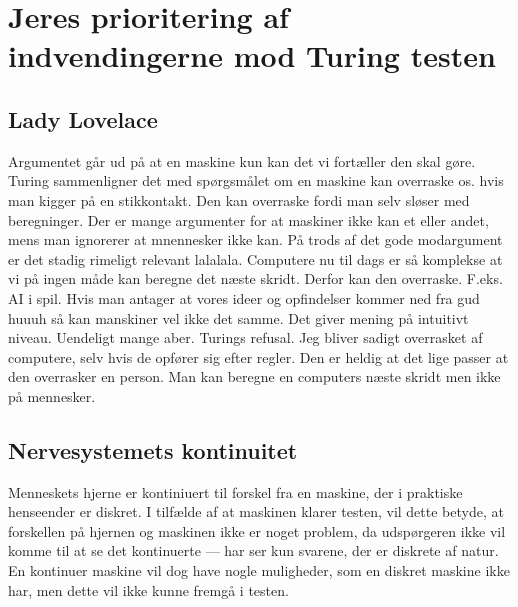 \documentclass{article}
\begin{document}

\section{Jeres prioritering af indvendingerne mod Turing testen}
\subsection{Lady Lovelace}
Argumentet går ud på at en maskine kun kan det vi fortæller den skal gøre. Turing sammenligner det med spørgsmålet om en maskine kan overraske os. hvis man kigger på en stikkontakt. Den kan overraske fordi man selv sløser med beregninger.
Der er mange argumenter for at maskiner ikke kan et eller andet, mens man ignorerer at mnennesker ikke kan.
På trods af det gode modargument er det stadig rimeligt relevant lalalala.
Computere nu til dags er så komplekse at vi på ingen måde kan beregne det næste skridt. Derfor kan den overraske. F.eks. AI i spil.
Hvis man antager at vores ideer og opfindelser kommer ned fra gud huuuh så kan manskiner vel ikke det samme.
Det giver mening på intuitivt niveau.
Uendeligt mange aber.
Turings refusal. Jeg bliver sadigt overrasket af computere, selv hvis de opfører sig efter regler. Den er heldig at det lige passer at den overrasker en person.
Man kan beregne en computers næste skridt men ikke på mennesker.

\subsection{Nervesystemets kontinuitet}

Menneskets hjerne er kontiniuert til forskel fra en maskine, der i praktiske henseender er diskret. I tilfælde af at maskinen klarer testen, vil dette betyde, at forskellen på hjernen og maskinen ikke er noget problem, da udspørgeren ikke vil komme til at se det kontinuerte --- har ser kun svarene, der er diskrete af natur. En kontinuer maskine vil dog have nogle muligheder, som en diskret maskine ikke har, men dette vil ikke kunne fremgå i testen.
\end{document}
